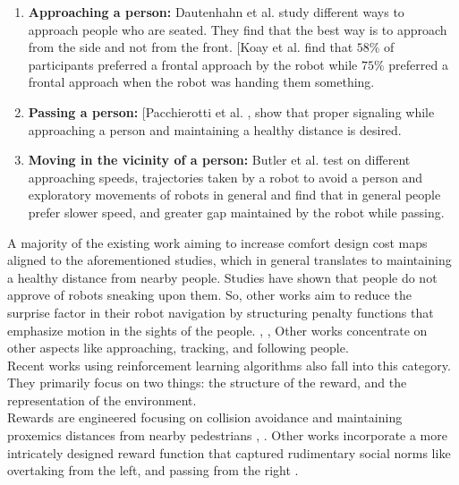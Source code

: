 \begin{enumerate}
    \item \textbf{Approaching a person:} Dautenhahn et al. \cite{dautenhahn_2006}  study different ways to approach people who are seated. They find that the best way is to approach from the side and not from the front.
    [Koay et al. \cite{koay2007ExploratorySO}  find that $58\%$ of participants preferred a frontal approach by the robot while $75\%$ preferred a frontal approach when the robot was handing them something.
    \item \textbf{Passing a person:} [Pacchierotti et al. \cite{pacchierotti_2006} \cite{pacchierotti_2005},  show that proper signaling while approaching a person and maintaining a healthy distance is desired.
    \item \textbf{Moving in the vicinity of a person:}  Butler et al. \cite{butler_2001} test on different approaching speeds, trajectories taken by a robot to avoid a person and exploratory movements of robots in general and find that in general people prefer slower speed, and greater gap maintained by the robot while passing.
\end{enumerate}

A majority of the existing work aiming to increase comfort design cost maps aligned to the aforementioned studies, which in general translates to maintaining a healthy distance from nearby people. Studies have shown that people do not approve of robots sneaking upon them. So, other works aim to reduce the surprise factor in their robot navigation by structuring penalty functions that emphasize motion in the sights of the people. \cite{pandey_2010_human_centered_nav}, \cite{scandolo_2011}, \cite{sisbot_human_2007}
Other works concentrate on other aspects like approaching, tracking, and following people.\\

Recent works using reinforcement learning algorithms also fall into this category. They primarily focus on two things: the structure of the reward, and the representation of the environment. \\

Rewards are engineered focusing on collision avoidance and maintaining proxemics distances from nearby pedestrians \cite{chen_crowd_aware_robot_nav_with_attention}, \cite{chen_decentralized_non_communication_2017}. Other works incorporate a more intricately designed reward function that captured rudimentary social norms like overtaking from the left,  and passing from the right \cite{chen_socially_2017}. \\

